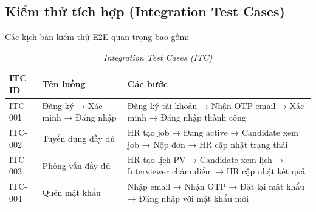 \subsection{Kiểm thử tích hợp (Integration Test Cases)}
Các kịch bản kiểm thử E2E quan trọng bao gồm:

\begin{table}[H]
    \centering
    \small
    \renewcommand{\arraystretch}{1.3}
    \begin{tabularx}{\textwidth}{|>{\centering\arraybackslash}p{2.2cm}|>{\raggedright\arraybackslash}X|>{\raggedright\arraybackslash}X|}
        \hline
        \textbf{ITC ID} & \textbf{Tên luồng} & \textbf{Các bước} \\ \hline
        ITC-001 & Đăng ký → Xác minh → Đăng nhập & Đăng ký tài khoản → Nhận OTP email → Xác minh → Đăng nhập thành công \\ \hline
        ITC-002 & Tuyển dụng đầy đủ & HR tạo job → Đăng active → Candidate xem job → Nộp đơn → HR cập nhật trạng thái \\ \hline
        ITC-003 & Phỏng vấn đầy đủ & HR tạo lịch PV → Candidate xem lịch → Interviewer chấm điểm → HR cập nhật kết quả \\ \hline
        ITC-004 & Quên mật khẩu & Nhập email → Nhận OTP → Đặt lại mật khẩu → Đăng nhập với mật khẩu mới \\ \hline
    \end{tabularx}
    \caption{\textit{Integration Test Cases (ITC)}}
\end{table}
